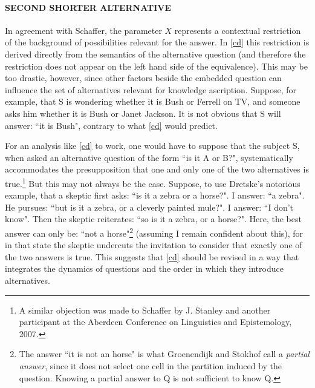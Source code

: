 \paragraph{SECOND SHORTER ALTERNATIVE}

In agreement with Schaffer, the parameter $X$ represents a
contextual restriction of the background of possibilities relevant
for the answer. In \ref{cd} this restriction is derived directly
from the semantics of the alternative question (and therefore the
restriction does not appear on the left hand side of the
equivalence).  
This may be too drastic, however, since other factors beside the embedded question can influence the set of   alternatives relevant for knowledge ascription. 
Suppose, for example, that S is wondering whether it is Bush or Ferrell on TV, and someone asks him
whether it is Bush or Janet Jackson. It is not obvious that S will
answer: ``it is Bush", contrary to what \ref{cd} would predict.  

 

For an analysis like \ref{cd} to work, one would have to suppose
that the subject S, when asked an alternative question of the form
``is it A or B?", systematically accommodates the presupposition
that one and only one of the two alternatives is true.\footnote{A
similar objection was made to Schaffer by J. Stanley and another
participant at the Aberdeen Conference on Linguistics and
Epistemology, 2007.} But this may not always be the case. Suppose,
to use Dretske's notorious example, that a skeptic first asks:
``is it a zebra or a horse?". I answer: ``a zebra". He pursues:
``but is it a zebra, or a cleverly painted mule?". I answer: ``I
don't know". Then the skeptic reiterates: ``so is it a zebra, or a
horse?". Here, the best answer can only be: ``not a horse"\footnote{The answer ``it is not an horse" is what Groenendijk and Stokhof
call a \emph{partial answer}, since it does not select one cell in
the partition induced by the question. Knowing a partial answer to Q is not sufficient to know Q.}
(assuming I remain confident about this), for in that state the
skeptic undercuts the invitation to consider that exactly one of
the two answers is true. This suggests that \ref{cd} should be
revised in a way that integrates the dynamics of questions and the
order in which they introduce alternatives.
 
 
